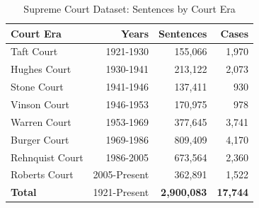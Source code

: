 \begin{table}[h]
\centering
\caption{Supreme Court Dataset: Sentences by Court Era}
\label{tab:court_summary}
\begin{tabular}{lrrr}
\toprule
\textbf{Court Era} & \textbf{Years} & \textbf{Sentences} & \textbf{Cases} \\
\midrule
Taft Court & 1921-1930 & 155,066 & 1,970 \\
Hughes Court & 1930-1941 & 213,122 & 2,073 \\
Stone Court & 1941-1946 & 137,411 & 930 \\
Vinson Court & 1946-1953 & 170,975 & 978 \\
Warren Court & 1953-1969 & 377,645 & 3,741 \\
Burger Court & 1969-1986 & 809,409 & 4,170 \\
Rehnquist Court & 1986-2005 & 673,564 & 2,360 \\
Roberts Court & 2005-Present & 362,891 & 1,522 \\
\midrule
\textbf{Total} & 1921-Present & \textbf{2,900,083} & \textbf{17,744} \\
\bottomrule
\end{tabular}
\end{table}
